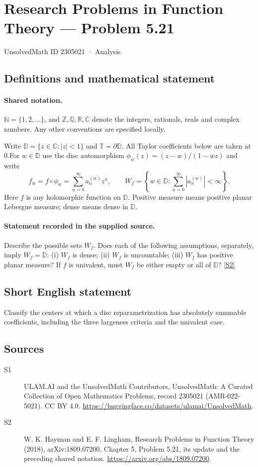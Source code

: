 \documentclass[11pt]{article}
\newcommand{\sref}[2]{\hyperlink{source:#1:#2}{[S#2]}}
\begin{document}
\setcounter{section}{2305020}
\section{Research Problems in Function Theory — Problem 5.21}\label{2305021}
{\small\sffamily UnsolvedMath ID 2305021 · Analysis}
\subsection{Definitions and mathematical statement}

\paragraph{Shared notation.}$\mathbb N=\{1,2,\ldots\}$, and $\mathbb Z,\mathbb Q,\mathbb R,\mathbb C$ denote the integers, rationals, reals and complex numbers. Any other conventions are specified locally.


Write $\mathbb D=\{z\in\mathbb C:|z|<1\}$ and $\mathbb T=\partial\mathbb D$. All Taylor coefficients below are taken at $0$.For $w\in\mathbb D$ use the disc automorphism $\phi_w(z)=(z-w)/(1-\overline w z)$ and write
\[f_w=f\circ\phi_w=\sum_{n=0}^\infty a_n^{(w)}z^n,\qquad
W_f=\left\{w\in\mathbb D:\sum_{n=0}^\infty|a_n^{(w)}|<\infty\right\}.
\]
Here $f$ is any holomorphic function on $\mathbb D$. Positive measure means positive planar Lebesgue measure; dense means dense in $\mathbb D$.
\paragraph{Statement recorded in the supplied source.}
Describe the possible sets $W_f$. Does each of the following assumptions, separately, imply $W_f=\mathbb D$: (i) $W_f$ is dense; (ii) $W_f$ is uncountable; (iii) $W_f$ has positive planar measure? If $f$ is univalent, must $W_f$ be either empty or all of $\mathbb D$? \sref{2305021}{2}
\subsection{Short English statement}
Classify the centers at which a disc reparametrization has absolutely summable coefficients, including the three largeness criteria and the univalent case.
\subsection{Sources}
\begin{description}
\item[\hypertarget{source:2305021:1}{S1}] ULAM.AI and the UnsolvedMath Contributors, UnsolvedMath: A Curated Collection of Open Mathematics Problems, record 2305021 (AMR-022-5021). CC BY 4.0. \url{https://huggingface.co/datasets/ulamai/UnsolvedMath}.
\item[\hypertarget{source:2305021:2}{S2}] W. K. Hayman and E. F. Lingham, Research Problems in Function Theory (2018), arXiv:1809.07200, Chapter 5, Problem 5.21, its update and the preceding shared notation. \url{https://arxiv.org/abs/1809.07200}.
\end{description}
\label{end:2305021}
\end{document}

